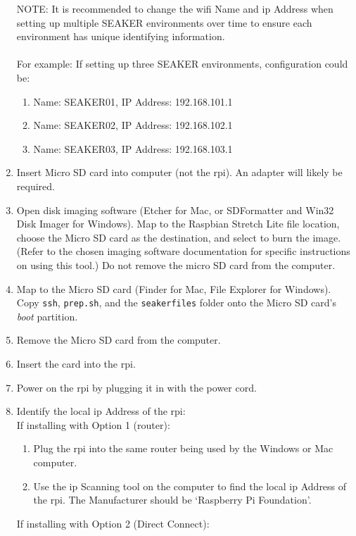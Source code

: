 \documentclass[12pt]{article}
\begin{document}
\begin{enumerate}
  NOTE: It is recommended to change the \gls{wifi} Name and \gls{ip} Address when
  setting up multiple SEAKER environments over time to ensure each
  environment has unique identifying information.\\
  \\
  For example: If setting up three SEAKER environments, configuration could be:
    \begin{enumerate}
      \item Name: SEAKER01, IP Address: 192.168.101.1
      \item Name: SEAKER02, IP Address: 192.168.102.1
      \item Name: SEAKER03, IP Address: 192.168.103.1
    \end{enumerate}
  \item Insert Micro SD card into computer (not the \gls{rpi}).
  An adapter will likely be required.
  \item Open disk imaging software (Etcher for Mac, or SDFormatter and 
  Win32 Disk Imager for Windows).
  Map to the Raspbian Stretch Lite file
  location, choose the Micro SD card as the destination, and select to burn
  the image. (Refer to the chosen imaging software documentation for
  specific instructions on using this tool.)  Do not remove the micro SD
  card from the computer.
  \item Map to the Micro SD card (Finder for Mac, File Explorer for Windows).
  Copy \verb|ssh|, \verb|prep.sh|, and the \verb|seakerfiles| folder onto the Micro SD card's
  {\em boot} partition.
  \item Remove the Micro SD card from the computer.
  \item Insert the card into the \gls{rpi}.
  \item Power on the \gls{rpi} by plugging it in with the power cord.
  \item Identify the local \gls{ip} Address of the \gls{rpi}:\\
  If installing with Option 1 (router):
    \begin{enumerate}
      \item Plug the \gls{rpi} into the same router being used by the
      Windows or Mac computer.
      \item Use the \gls{ip} Scanning tool on the computer to find the local \gls{ip}
      Address of the \gls{rpi}. The Manufacturer should be ‘Raspberry
      Pi Foundation’.
    \end{enumerate}
  If installing with Option 2 (Direct Connect):
    \begin{enumerate}

\end{enumerate}
\end{enumerate}
\end{document}
